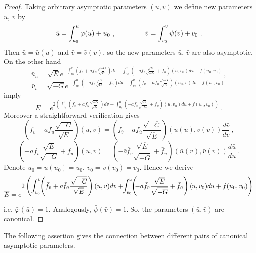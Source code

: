 \documentclass[12pt]{amsart}
\theoremstyle{definition}
\theoremstyle{remark}
\newcommand{\ds}{\displaystyle}
\begin{document}
\begin{proof}

Taking arbitrary  asymptotic parameters $(u,v)$ we define new parameters $\bar u$, $\bar v$ by 
$$
	\bar u=\ds \int_{u_0}^u\varphi(u) +u_0 \ , \hspace{1.5cm}
		\bar v=\ds \int_{v_0}^v\psi(v) +v_0 \ .
$$ 
Then  $\bar u=\bar u(u)$ and $\bar v=\bar v(v)$, so the new parameters 
$\bar u$, $\bar v$ are also asymptotic.  On the other hand
$$
	\bar u_u=\sqrt Ee^{-\ds\int_{v_0}^v\left(f_v+af_u\frac{\sqrt {-G}}{\sqrt E}\right)dv
		                -\int_{u_0}^u\left(-af_v\frac{\sqrt {E}}{\sqrt{-G}}+f_u\right)(u,v_0)du-f(u_0,v_0)} \ ,
$$
$$
	\bar v_v=\sqrt {-G}e^{-\ds\int_{u_0}^u\left(-af_v\frac{\sqrt E}{\sqrt G}+f_u\right)du
		                -\int_{v_0}^v\left(f_v+af_u\frac{\sqrt {-G}}{\sqrt E}\right)(u_0,v)dv-f(u_0,v_0)} \ 
$$
imply
$$
	\overline E =e^{\ds2\left( \int_{v_0}^v\left(f_v+af_u\frac{\sqrt{-G}}{\sqrt E}\right)dv
		                +\int_{u_0}^u\left(-af_v\frac{\sqrt {E}}{\sqrt {-G}}+f_u\right)(u,v_0)du+f(u_0,v_0) \right)}  \ .
$$  
Moreover a straightforward verification gives
$$
	\ds \left(f_v+af_u\frac{\sqrt {-G}}{\sqrt {E}}\right)(u,v)
				=\left(\bar f_{\bar v}+\bar a\bar f_{\bar u}\frac{\sqrt{-\overline G}}{\sqrt {\overline E}}\right)(\bar u(u),\bar v(v))\frac{d\bar v}{dv} \ ,
$$
$$
	\ds \left(-af_v\frac{\sqrt {E}}{\sqrt {-G}}+f_u\right)(u,v)
				=\left(-\bar a\bar f_{\bar v}\frac{\sqrt {\overline E}}{\sqrt { {-\overline G}}}+\bar f_{\bar u}\right)(\bar u(u),\bar v(v))\frac{d\bar u}{du} \ .
$$
Denote $\bar u_0=\bar u(u_0)=u_0$, $\bar v_0=\bar v(v_0)=v_0$. Hence we derive
$$
	\overline E=e^{\ds 2\left( \int_{\bar v_0}^{\bar v} \hspace{-1mm}\left(\bar f_{\bar v}
																+\bar a\bar f_{\bar u}\frac{\sqrt {{-\overline G}}}{\sqrt {\overline E}}\right)(\bar u,\bar v)d\bar v
		                +\hspace{-1mm}\int_{\bar u_0}^{\bar u}\hspace{-1mm}\left(\hspace{-1mm}-\bar a\bar f_{\bar v}\frac{\sqrt {\overline E}}{\sqrt {{-\overline G}}}
										+ \bar f_{\bar u}\right)(\bar u,\bar v_0)d\bar u  +f(\bar u_0,\bar v_0) \right)} 
$$
i.e. $\bar\varphi (\bar u)=1$.
Analogously,  $\bar\psi(\bar v)=1$. So, the parameters $(\bar u,\bar v)$ are canonical.

\end{proof}

The following assertion gives the connection between different pairs of canonical
asymptotic parameters.
\end{document}

